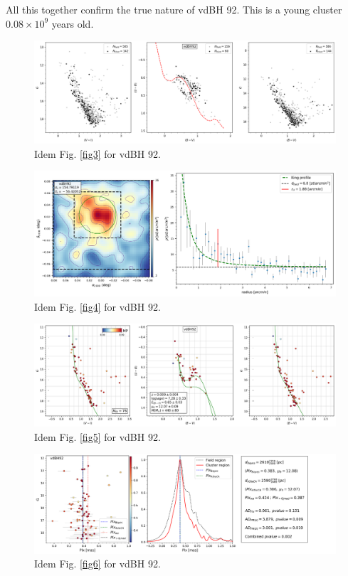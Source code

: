 \documentclass[draft]{aa}
\begin{document}
All this together confirm the true nature of vdBH 92. This is a
young cluster $0.08\times10^9$ years old.

\begin{figure}[ht]
    \centering
    \includegraphics[width=\hsize]{../figs/obs_vdBH92.png}
    \caption{Idem Fig. \ref{fig3} for vdBH 92.}
    \label{fig35}
\end{figure}
\begin{figure}[ht]
    \centering
    \includegraphics[width=\hsize]{../figs/dmap_vdbh92.png}
    \caption{Idem Fig. \ref{fig4} for vdBH 92.}
    \label{fig36}
\end{figure}
\begin{figure}[ht]
    \centering
    \includegraphics[width=\hsize]{../figs/cmds_vdbh92.png}
    \caption{Idem Fig. \ref{fig5} for vdBH 92.}
    \label{fig37}
\end{figure}
\begin{figure}[ht]
    \centering
    \includegraphics[width=\hsize]{../figs/plx_vdBH92.png}
    \caption{Idem Fig. \ref{fig6} for vdBH 92.}
    \label{fig38}
\end{figure}
\end{document}
